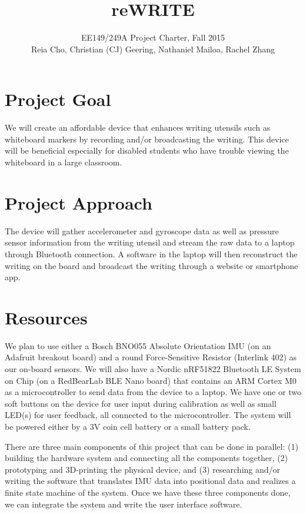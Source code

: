 \documentclass[12pt,journal]{IEEEtran}
\begin{document}
\title{reWRITE}

\author{EE149/249A Project Charter, Fall 2015

Reia Cho, Christian (CJ) Geering, Nathaniel Mailoa, Rachel Zhang}


\maketitle

\section{Project Goal}
We will create an affordable device that enhances writing utensils such as whiteboard markers by recording and/or broadcasting the writing. This device will be beneficial especially for disabled students who have trouble viewing the whiteboard in a large classroom.


\section{Project Approach}
The device will gather accelerometer and gyroscope data as well as pressure sensor information from the writing utensil and stream the raw data to a laptop through Bluetooth connection. A software in the laptop will then reconstruct the writing on the board and broadcast the writing through a website or smartphone app.


\section{Resources}
We plan to use either a Bosch BNO055 Absolute Orientation IMU (on an Adafruit breakout board) and a round Force-Sensitive Resistor (Interlink 402) as our on-board sensors. We will also have a Nordic nRF51822 Bluetooth LE System on Chip (on a RedBearLab BLE Nano board) that contains an ARM Cortex M0 as a microcontroller to send data from the device to a laptop. We have one or two soft buttons on the device for user input during calibration as well as small LED(s) for user feedback, all connected to the microcontroller. The system will be powered either by a 3V coin cell battery or a small battery pack.

There are three main components of this project that can be done in parallel: (1) building the hardware system and connecting all the components together, (2) prototyping and 3D-printing the physical device, and (3) researching and/or writing the software that translates IMU data into positional data and realizes a finite state machine of the system. Once we have these three components done, we can integrate the system and write the user interface software.
\end{document}
